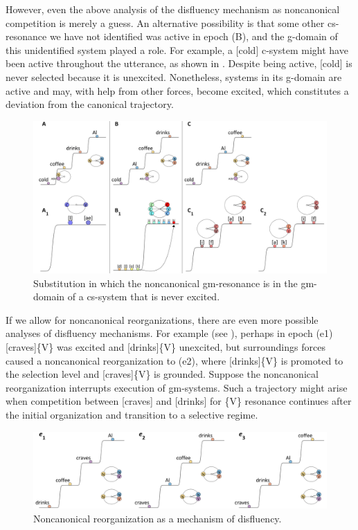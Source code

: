   However, even the above analysis of the disfluency mechanism as noncanonical competition is merely a guess. An alternative possibility is that some other cs-resonance we have not identified was active in epoch (B), and the g-domain of this unidentified system played a role. For example, a [cold] c-system might have been active throughout the utterance, as shown in {}. Despite being active, [cold] is never selected because it is unexcited. Nonetheless, systems in its g-domain are active and may, with help from other forces, become excited, which constitutes a deviation from the canonical trajectory.

  
\begin{figure}
\includegraphics[width=\textwidth]{figures/Tilsen-img59.png}
\caption{Substitution in which the noncanonical gm-resonance is in the gm-domain of a cs-system that is never excited.}
\label{fig:4:9}
\end{figure}
 

  If we allow for noncanonical reorganizations, there are even more possible analyses of disfluency mechanisms. For example (see {}), perhaps in epoch (e1) [craves]\{V\} was excited and [drinks]\{V\} unexcited, but surroundings forces caused a noncanonical reorganization to (e2), where [drinks]\{V\} is promoted to the selection level and [craves]\{V\} is grounded. Suppose the noncanonical reorganization interrupts execution of gm-systems. Such a trajectory might arise when competition between [craves] and [drinks] for \{V\} resonance continues after the initial organization and transition to a selective regime. 

  
\begin{figure}
\includegraphics[width=\textwidth]{figures/Tilsen-img60.png}
\caption{Noncanonical reorganization as a mechanism of disfluency.}
\label{fig:4:10}
\end{figure}
 

